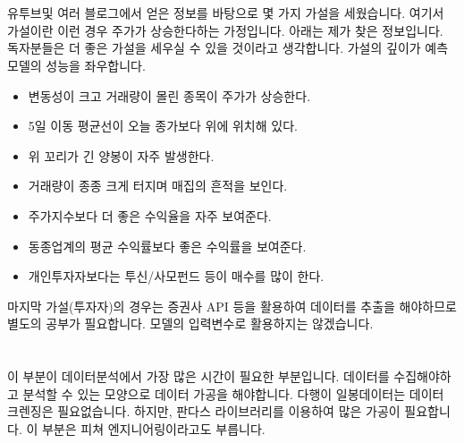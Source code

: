 \documentclass[letterpaper,10pt,english]{jupyterBook}
\begin{document}
\chapter{}
\label{\detokenize{chapter4/4.3.0_My_Strategy:id1}}\label{\detokenize{chapter4/4.3.0_My_Strategy::doc}}
\sphinxAtStartPar
유투브및 여러 블로그에서 얻은 정보를 바탕으로 몇 가지 가설을 세웠습니다. 여기서 가설이란 이런 경우 주가가 상승한다하는 가정입니다. 아래는 제가 찾은 정보입니다. 독자분들은 더 좋은 가설을 세우실 수 있을 것이라고 생각합니다. 가설의 깊이가 예측 모델의 성능을 좌우합니다.
\begin{itemize}
\item {} 
\sphinxAtStartPar
변동성이 크고 거래량이 몰린 종목이 주가가 상승한다.

\item {} 
\sphinxAtStartPar
5일 이동 평균선이 오늘 종가보다 위에 위치해 있다.

\item {} 
\sphinxAtStartPar
위 꼬리가 긴 양봉이 자주 발생한다.

\item {} 
\sphinxAtStartPar
거래량이 종종 크게 터지며 매집의 흔적을 보인다.

\item {} 
\sphinxAtStartPar
주가지수보다 더 좋은 수익율을 자주 보여준다.

\item {} 
\sphinxAtStartPar
동종업계의 평균 수익률보다 좋은 수익률을 보여준다.

\item {} 
\sphinxAtStartPar
개인투자자보다는 투신/사모펀드 등이 매수를 많이 한다.

\end{itemize}

\sphinxAtStartPar
마지막 가설(투자자)의 경우는 증권사 API 등을 활용하여 데이터를 추출을 해야하므로 별도의 공부가 필요합니다. 모델의 입력변수로 활용하지는 않겠습니다.


\chapter{}
\label{\detokenize{chapter4/4.4.0_Data_Collection:id1}}\label{\detokenize{chapter4/4.4.0_Data_Collection::doc}}
\sphinxAtStartPar
이 부분이 데이터분석에서 가장 많은 시간이 필요한 부분입니다. 데이터를 수집해야하고 분석할 수 있는 모양으로 데이터 가공을 해야합니다. 다행이 일봉데이터는 데이터 크렌징은 필요없습니다. 하지만, 판다스 라이브러리를 이용하여 많은 가공이 필요합니다. 이 부분은 피쳐 엔지니어링이라고도 부릅니다.
\end{document}
